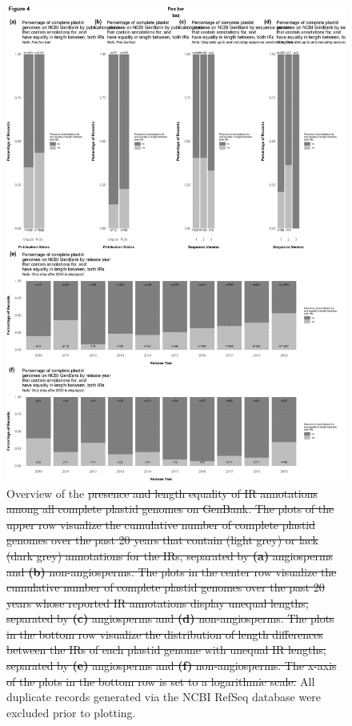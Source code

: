 \documentclass[a4paper,portrait]{article}
\begin{document}
\begin{figure}[!htbp]%
\centering
\includegraphics[width=1.00\linewidth]{input/MANUSCRIPT_Figure4.pdf}
\caption{Overview of the \sout{presence and length equality of IR annotations among all complete plastid genomes on GenBank. The plots of the upper row visualize the cumulative number of complete plastid genomes over the past 20 years that contain (light grey) or lack (dark grey) annotations for the IRs, separated by \textbf{(a)} angiosperms and \textbf{(b)} non-angiosperms. The plots in the center row visualize the cumulative number of complete plastid genomes over the past 20 years whose reported IR annotations display unequal lengths, separated by \textbf{(c)} angiosperms and \textbf{(d)} non-angiosperms. The plots in the bottom row visualize the distribution of length differences between the IRs of each plastid genome with unequal IR lengths, separated by \textbf{(e)} angiosperms and \textbf{(f)} non-angiosperms. The x-axis of the plots in the bottom row is set to a logarithmic scale.} All duplicate records generated via the NCBI RefSeq database were excluded prior to plotting.}

\label{fig:Figure4}
\end{figure}
\end{document}
